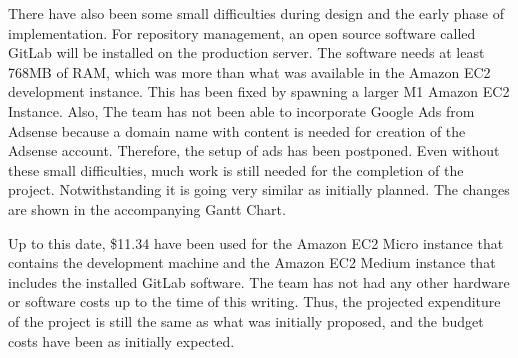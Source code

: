 There have also been some small difficulties during design and the early phase
of implementation. For repository management, an open source software called
GitLab will be installed on the production server. The software needs at least
768MB of RAM, which was more than what was available in the Amazon EC2
development instance. This has been fixed by spawning a larger M1 Amazon EC2
Instance. Also, The team has not been able to incorporate Google Ads from
Adsense because a domain name with content is needed for creation of the Adsense
account. Therefore, the setup of ads has been postponed. Even without these
small difficulties, much work is still needed for the completion of the project.
Notwithstanding it is going very similar as initially planned. The changes are
shown in the accompanying Gantt Chart.

Up to this date, \$11.34 have been used for the Amazon EC2 Micro instance that
contains the development machine and the Amazon EC2 Medium instance that
includes the installed GitLab software. The team has not had any other hardware
or software costs up to the time of this writing. Thus, the projected
expenditure of the project is still the same as what was initially proposed, and
the budget costs have been as initially expected.
